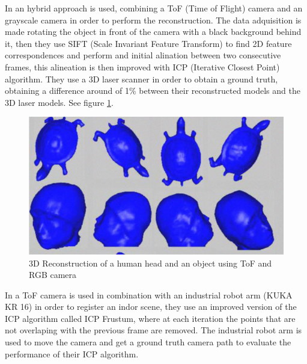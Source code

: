 In \cite{guangyu} an hybrid approach is used, combining a ToF (Time of Flight) camera and an grayscale camera in order to perform the reconstruction. 
The data adquisition is made rotating the object in front of the camera with a black background behind it, then they use 
SIFT (Scale Invariant Feature Transform) to find 2D feature correspondences and perform and initial alination between two consecutive frames, this alineation is 
then improved with ICP (Iterative Closest Point) algorithm. They use a 3D laser scanner in order to obtain a ground truth, obtaining a difference around of 1\% 
between their reconstructed
 models and the 3D laser models. See figure \ref{fig:guangyu}.




\begin{figure}[h!]
\begin{center}
\includegraphics[scale=0.38]{images/guangyu}
\caption{3D Reconstruction of a human head and an object using ToF and RGB camera}
\label{fig:guangyu}
\end{center}
\end{figure}

In \cite{may2009} a ToF camera is used in combination with an industrial robot arm (KUKA KR 16) in order to register an indor scene,
they use an improved version of the ICP algorithm called ICP Frustum, where at each iteration the points that are not overlaping with the previous frame are removed. The industrial robot arm is used to move the camera and get a ground truth camera path to evaluate the performance of their ICP algorithm. 


